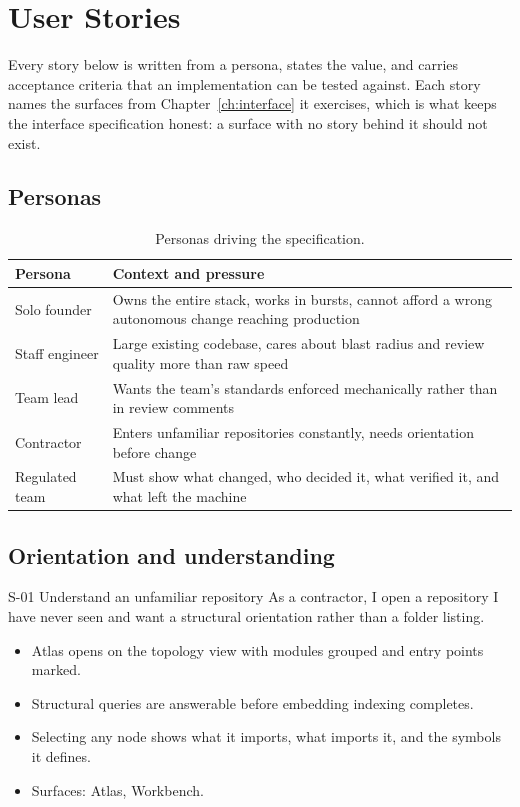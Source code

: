 \chapter{User Stories}
\label{ch:stories}

Every story below is written from a persona, states the value, and carries acceptance
criteria that an implementation can be tested against. Each story names the surfaces from
Chapter~\ref{ch:interface} it exercises, which is what keeps the interface specification
honest: a surface with no story behind it should not exist.

\section{Personas}

\begin{table}[h]
\centering
\small
\begin{tabularx}{\textwidth}{l X}
\toprule
\textbf{Persona} & \textbf{Context and pressure} \\
\midrule
Solo founder & Owns the entire stack, works in bursts, cannot afford a wrong autonomous change reaching production \\
Staff engineer & Large existing codebase, cares about blast radius and review quality more than raw speed \\
Team lead & Wants the team's standards enforced mechanically rather than in review comments \\
Contractor & Enters unfamiliar repositories constantly, needs orientation before change \\
Regulated team & Must show what changed, who decided it, what verified it, and what left the machine \\
\bottomrule
\end{tabularx}
\caption{Personas driving the specification.}
\end{table}

\section{Orientation and understanding}

\begin{story}{S-01 \quad Understand an unfamiliar repository}
As a contractor, I open a repository I have never seen and want a structural orientation
rather than a folder listing.
\end{story}
\begin{itemize}
  \item Atlas opens on the topology view with modules grouped and entry points marked.
  \item Structural queries are answerable before embedding indexing completes.
  \item Selecting any node shows what it imports, what imports it, and the symbols it defines.
  \item Surfaces: Atlas, Workbench.
\end{itemize}

